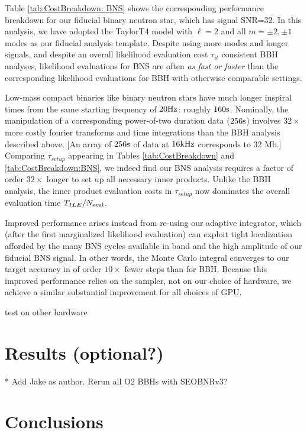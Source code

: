 \documentclass[twocolumn,prd,nofootinbib]{revtex4}
\newcommand\unit[1]{{\rm #1}}
\newcommand\editremark[1]{{\color{red} #1}}
\begin{document}
Table \ref{tab:CostBreakdown: BNS} shows the corresponding performance breakdown for our fiducial binary neutron star,
which has signal SNR=32.  In this analysis, we have adopted the TaylorT4 model with $\ell=2$ and all $m=\pm 2,\pm 1$ modes as our
fiducial analysis template.   Despite using more modes and longer signals, and despite an overall likelihood evaluation
cost $\tau_{it}$ consistent BBH analyses,  likelihood evaluations for BNS are often
\emph{as fast or faster} than the corresponding likelihood evaluations for BBH with otherwise comparable settings.

Low-mass compact binaries like binary neutron stars have much longer inspiral times from the same starting frequency of
$20\unit{Hz}$: roughly $160 \unit{s}$.   Nominally, the manipulation of a corresponding power-of-two duration data ($256\unit{s}$) involves
$32\times$ more costly fourier transforms and time integrations than the BBH analysis described above.  
[An array of $256\unit{s}$ of data at $16\unit{kHz}$ corresponds to  32 Mb.]  Comparing $\tau_{setup}$ appearing in Tables
 \ref{tab:CostBreakdown} and  \ref{tab:CostBreakdown:BNS}, we indeed find our BNS analysis requires  a factor of order   $32\times$
 longer to set up all necessary inner products.  Unlike the BBH analysis, the inner product evaluation costs in
 $\tau_{setup}$ now dominates the
 overall evaluation time $T_{ILE}/N_{\rm eval}$. 


Improved performance arises instead from re-using our adaptive integrator, which (after the first marginalized
likelihood evaluation) can exploit tight localization afforded by the many BNS cycles available in band and the high
amplitude of our fiducial BNS signal.  In other
words, the Monte Carlo integral converges to our target accuracy in of order $10\times $ fewer steps than for BBH.  
Because this improved performance relies on the sampler, not on our choice of hardware, we achieve a similar substantial
improvement for all choices of GPU.


\editremark{test on other hardware}


\section{ Results (optional?)}

* Add Jake as author.  Rerun all O2 BBHs with SEOBNRv3?

\section{Conclusions}
\end{document}
